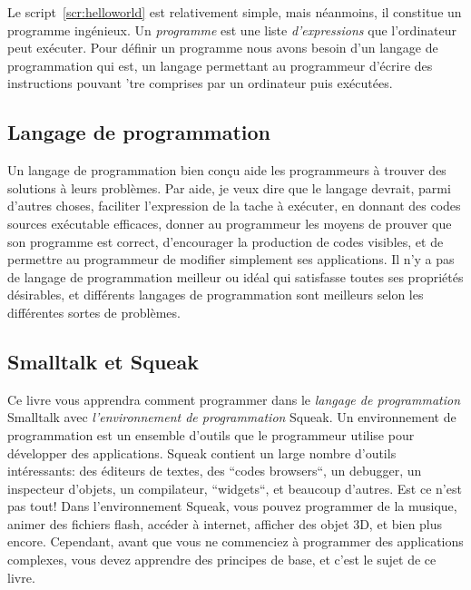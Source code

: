 \documentclass[a4paper,10pt,twoside]{book}
\begin{document}
Le script~\ref{scr:helloworld} est relativement simple, mais n\'eanmoins, il constitue un programme ing\'enieux. Un \emph{programme} est une liste \emph{d'expressions} que l'ordinateur peut ex\'ecuter. Pour d\'efinir un programme nous avons besoin d'un langage de programmation qui est, un langage permettant au programmeur d'\'ecrire des instructions pouvant 'tre comprises par un ordinateur puis ex\'ecut\'ees.

\subsection{Langage de programmation}

Un langage de programmation bien con\c cu aide les programmeurs \`a trouver des solutions \`a leurs probl\`emes. Par aide, je veux dire que le langage devrait, parmi d'autres choses, faciliter l'expression de la tache \`a ex\'ecuter, en donnant des codes sources ex\'ecutable efficaces, donner au programmeur les moyens de prouver que son programme est correct, d'encourager la production de codes visibles, et de permettre au programmeur de modifier simplement ses applications. Il n'y a pas de langage de programmation meilleur ou id\'eal qui satisfasse toutes ses propri\'et\'es d\'esirables, et diff\'erents langages de programmation sont meilleurs selon les diff\'erentes sortes de probl\`emes.

\subsection{Smalltalk et Squeak}

Ce livre vous apprendra comment programmer dans le \emph{langage de programmation} Smalltalk avec \emph{l'environnement de programmation} Squeak. Un environnement de programmation est un ensemble d'outils que le programmeur utilise pour d\'evelopper des applications. Squeak contient un large nombre d'outils int\'eressants: des \'editeurs de textes, des ``codes browsers``, un debugger, un inspecteur d'objets, un compilateur, ``widgets``, et beaucoup d'autres. Est ce n'est pas tout! Dans l'environnement Squeak, vous pouvez programmer de la musique, animer des fichiers flash, acc\'eder \`a internet, afficher des objet 3D, et bien plus encore. Cependant, avant que vous ne commenciez \`a programmer des applications complexes, vous devez apprendre des principes de base, et c'est le sujet de ce livre.
\end{document}
